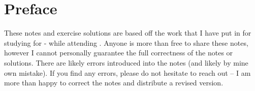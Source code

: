 \documentclass[../main.tex]{subfile}
\begin{document}
\chapter[Preface]{Preface}\label{chap:Preface}

These notes and exercise solutions are based off the work that I have put in for studying for \courseNumber - \courseName while attending \courseUni. 
Anyone is more than free to share these notes, however I cannot personally guarantee the full correctness of the notes or solutions. There are likely 
errors introduced into the notes (and likely by mine own mistake). If you find any errors, please do not hesitate to reach out -- I am more than happy 
to correct the notes and distribute a revised version. 
\end{document}
